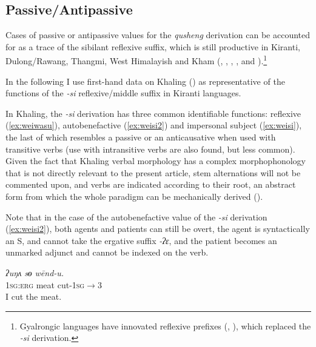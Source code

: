 \documentclass[oneside,a4paper,11pt]{article}
\newcommand{\ipa}[1]{{\phon\textit{\mbox{#1}}}}
\begin{document}

\subsection{Passive/Antipassive} \label{sec:passive}
Cases of passive or antipassive values for the \textit{qusheng} derivation can be accounted for as a trace of the sibilant reflexive suffix, which is still productive in Kiranti, Dulong/Rawang, Thangmi, West Himalayish and Kham (\citealt[94]{bauman75}, \citealt[320]{driem93agreement}, \citealt[240-7]{watters02grammar}, \citealt{lapolla04reflexive}, \citealt[372-6]{turin12thangmi} and \citealt[452;466]{widmer14bunan}).\footnote{Gyalrongic languages have innovated reflexive prefixes (\citealt{jacques10refl}, \citealt[89]{lai13affixale}), which replaced the \ipa{-si} derivation.} 

In the following I use first-hand data on Khaling (\citealt{jacques16si}) as representative of the functions of the \ipa{-si} reflexive/middle suffix in Kiranti languages.

In Khaling, the  \ipa{-si} derivation has three common identifiable functions: reflexive (\ref{ex:weiwasu}), autobenefactive (\ref{ex:weisi2}) and impersonal subject (\ref{ex:weisi}), the last of which resembles a passive or an anticausative when used with transitive verbs (use with intransitive verbs are also found, but less common). Given the fact that Khaling verbal morphology has a complex morphophonology that is not directly relevant to the present article, stem alternations will not be commented upon, and verbs are indicated according to their root, an abstract form from which the whole paradigm can be mechanically derived (\citealt{jacques12khaling, jacques16si}).

Note that in the case of the autobenefactive value of the \ipa{-si} derivation (\ref{ex:weisi2}), both agents and patients can still be overt, the agent is syntactically an S, and cannot take the ergative suffix \ipa{-ʔɛ}, and the patient becomes an unmarked adjunct and cannot be indexed on the verb.
 
\begin{exe}
\ex \label{ex:wendu} 
\gll 
\ipa{ʔuŋʌ}  	\ipa{sɵ}  	\ipa{wēnd-u.}  \\
\textsc{1sg:erg} meat cut-\textsc{1sg$\rightarrow$3} \\
\glt I cut the meat.
\end{exe}
\end{document}
